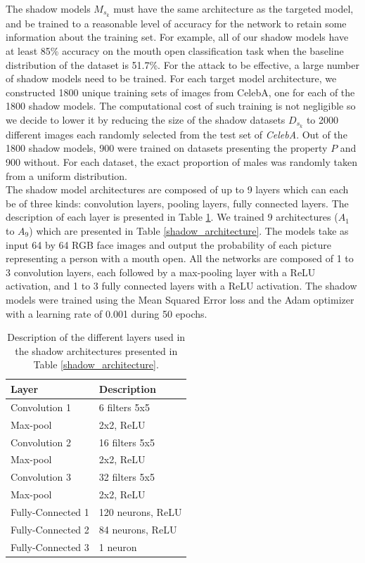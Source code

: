\documentclass[11pt]{article}
\begin{document}
The shadow models $M_{s_k}$ must have the same architecture as the targeted model, and be trained to a reasonable level of accuracy for the network to retain some information about the training set. For example, all of our shadow models have at least 85\% accuracy on the mouth open classification task when the baseline distribution of the dataset is 51.7\%. For the attack to be effective, a large number of shadow models need to be trained. For each target model architecture, we constructed 1800 unique training sets of images from CelebA, one for each of the 1800 shadow models. The computational cost of such training is not negligible so we decide to lower it by reducing the size of the shadow datasets $D_{s_k}$ to 2000 different images each randomly selected from the test set of \textit{CelebA}. Out of the 1800 shadow models, 900  were trained on datasets presenting the property $P$ and 900 without. For each dataset, the exact proportion of males was randomly taken from a uniform distribution.\\

The shadow model architectures are composed of up to 9 layers which can each be of three kinds: convolution layers, pooling layers, fully connected layers. The description of each layer is presented in Table \ref{layer_description}. We trained 9 architectures ($A_1$ to $A_9$) which are presented in Table \ref{shadow_architecture}. The models take as input 64 by 64 RGB face images and output the probability of each picture representing a person with a mouth open. All the networks are composed of 1 to 3 convolution layers, each followed by a max-pooling layer with a ReLU activation, and 1 to 3 fully connected layers with a ReLU activation. The shadow models were trained using the Mean Squared Error loss and the Adam optimizer with a learning rate of 0.001 during 50 epochs.\\

\begin{table}[h!]
\centering
\begin{tabular}{@{}ll@{}}
\toprule
Layer              & Description       \\ \midrule
Convolution 1     & 6 filters 5x5     \\
Max-pool          & 2x2, ReLU         \\
Convolution 2     & 16 filters 5x5    \\
Max-pool          & 2x2, ReLU         \\
Convolution 3     & 32 filters 5x5    \\
Max-pool          & 2x2, ReLU         \\
Fully-Connected 1 & 120 neurons, ReLU \\
Fully-Connected 2 & 84 neurons, ReLU  \\
Fully-Connected 3 & 1 neuron          \\ \bottomrule
\end{tabular}
\caption{Description of the different layers used in the shadow architectures presented in Table \ref{shadow_architecture}.}
\label{layer_description}
\end{table}
\end{document}
